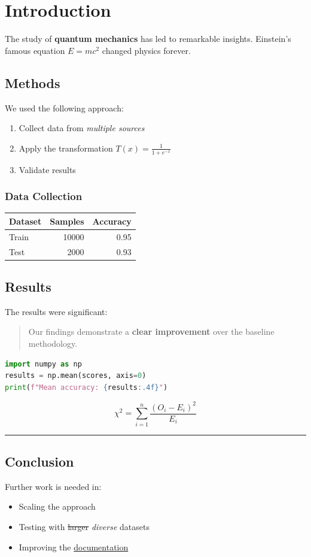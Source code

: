 \section{Introduction}\label{introduction}
The study of \textbf{quantum mechanics} has led to remarkable insights.
Einstein’s famous equation $E = mc^2$ changed physics forever.

\subsection{Methods}\label{methods}
We used the following approach:

\begin{enumerate}
\tightlist
\item Collect data from \emph{multiple sources}

\item Apply the transformation $T(x) = \frac{1}{1 + e^{-x}}$

\item Validate results

\end{enumerate}
\subsubsection{Data Collection}\label{data-collection}
\begin{longtable}[]{@{}lrr@{}}
\toprule
\textbf{Dataset} & \textbf{Samples} & \textbf{Accuracy} \\
\midrule
Train & 10000 & 0.95 \\
Test & 2000 & 0.93 \\
\bottomrule
\end{longtable}
\subsection{Results}\label{results}
The results were significant:

\begin{quote}
Our findings demonstrate a \textbf{clear improvement} over
the baseline methodology.

\end{quote}
\begin{lstlisting}[language=python]
import numpy as np
results = np.mean(scores, axis=0)
print(f"Mean accuracy: {results:.4f}")
\end{lstlisting}
\[
\chi^2 = \sum_{i=1}^{n} \frac{(O_i - E_i)^2}{E_i}
\]

\noindent\rule{\textwidth}{0.4pt}

\subsection{Conclusion}\label{conclusion}
Further work is needed in:

\begin{itemize}
\tightlist
\item Scaling the approach

\item Testing with \sout{larger} \emph{diverse} datasets

\item Improving the \href{https://example.com}{documentation}

\end{itemize}

